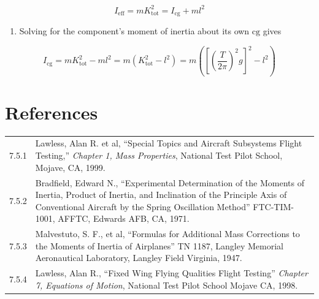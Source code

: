 \documentclass[
]{book}
\providecommand{\tightlist}{%
  \setlength{\itemsep}{0pt}\setlength{\parskip}{0pt}}
\begin{document}
\[ I_{\mathrm{eff}} = m K_{\mathrm{tot}}^2 = I_{\mathrm{cg}} + ml^2 \]

\begin{enumerate}
\def\labelenumi{\arabic{enumi}.}
\setcounter{enumi}{2}
\tightlist
\item
  Solving for the component's moment of inertia about its own \(\mathrm{cg}\) gives
\end{enumerate}

\[ I_{\mathrm{cg}} = m K_{\mathrm{tot}}^2 - ml^2 = m \left( K_{\mathrm{tot}}^2 - l^2 \right) = m \left( \left[ \left( \frac{T}{2 \pi} \right)^2 g \right]^2 - l^2 \right) \]

\hypertarget{references-5}{%
\section{References}\label{references-5}}

\begin{longtable}[]{@{}ll@{}}
\toprule
\endhead
\begin{minipage}[t]{0.05\columnwidth}\raggedright
7.5.1\strut
\end{minipage} & \begin{minipage}[t]{0.89\columnwidth}\raggedright
Lawless, Alan R. et al, ``Special Topics and Aircraft Subsystems Flight Testing,'' \emph{Chapter 1, Mass Properties}, National Test Pilot School, Mojave, CA, 1999.\strut
\end{minipage}\tabularnewline
\begin{minipage}[t]{0.05\columnwidth}\raggedright
7.5.2\strut
\end{minipage} & \begin{minipage}[t]{0.89\columnwidth}\raggedright
Bradfield, Edward N., ``Experimental Determination of the Moments of Inertia, Product of Inertia, and Inclination of the Principle Axis of Conventional Aircraft by the Spring Oscillation Method'' FTC-TIM-1001, AFFTC, Edwards AFB, CA, 1971.\strut
\end{minipage}\tabularnewline
\begin{minipage}[t]{0.05\columnwidth}\raggedright
7.5.3\strut
\end{minipage} & \begin{minipage}[t]{0.89\columnwidth}\raggedright
Malvestuto, S. F., et al, ``Formulas for Additional Mass Corrections to the Moments of Inertia of Airplanes'' TN 1187, Langley Memorial Aeronautical Laboratory, Langley Field Virginia, 1947.\strut
\end{minipage}\tabularnewline
\begin{minipage}[t]{0.05\columnwidth}\raggedright
7.5.4\strut
\end{minipage} & \begin{minipage}[t]{0.89\columnwidth}\raggedright
Lawless, Alan R., ``Fixed Wing Flying Qualities Flight Testing'' \emph{Chapter 7, Equations of Motion}, National Test Pilot School Mojave CA, 1998.\strut
\end{minipage}\tabularnewline
\bottomrule
\end{longtable}
\end{document}
